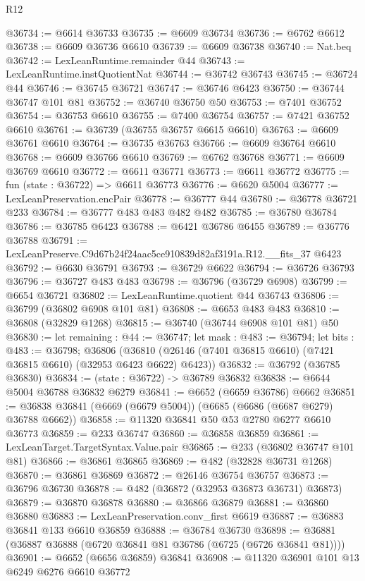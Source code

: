\begin{lexlean}{R12}
\begin{coremodule}
@36734 := @6614 @36733
@36735 := @6609 @36734
@36736 := @6762 @6612
@36738 := @6609 @36736 @6610
@36739 := @6609 @36738
@36740 := Nat.beq
@36742 := LexLeanRuntime.remainder @44
@36743 := LexLeanRuntime.instQuotientNat
@36744 := @36742 @36743
@36745 := @36724 @44
@36746 := @36745 @36721
@36747 := @36746 @6423
@36750 := @36744 @36747 @101 @81
@36752 := @36740 @36750 @50
@36753 := @7401 @36752
@36754 := @36753 @6610
@36755 := @7400 @36754
@36757 := @7421 @36752 @6610
@36761 := @36739 (@36755 @36757 @6615 @6610)
@36763 := @6609 @36761 @6610
@36764 := @36735 @36763
@36766 := @6609 @36764 @6610
@36768 := @6609 @36766 @6610
@36769 := @6762 @36768
@36771 := @6609 @36769 @6610
@36772 := @6611 @36771
@36773 := @6611 @36772
@36775 := fun (state : @36722) => @6611 @36773
@36776 := @6620 @5004
@36777 := LexLeanPreservation.encPair
@36778 := @36777 @44
@36780 := @36778 @36721 @233
@36784 := @36777 @483 @483 @482 @482
@36785 := @36780 @36784
@36786 := @36785 @6423
@36788 := @6421 @36786 @6455
@36789 := @36776 @36788
@36791 := LexLeanPreserve.C9d67b24f24aac5ce910839d82af3191a.R12.__fits_37 @6423
@36792 := @6630 @36791
@36793 := @36729 @6622
@36794 := @36726 @36793
@36796 := @36727 @483 @483
@36798 := @36796 (@36729 @6908)
@36799 := @6654 @36721
@36802 := LexLeanRuntime.quotient @44 @36743
@36806 := @36799 (@36802 @6908 @101 @81)
@36808 := @6653 @483 @483
@36810 := @36808 (@32829 @1268)
@36815 := @36740 (@36744 @6908 @101 @81) @50
@36830 := let remaining : @44 := @36747;
  let mask : @483 := @36794;
  let bits : @483 := @36798;
  @36806 (@36810 (@26146 (@7401 @36815 @6610) (@7421 @36815 @6610) (@32953 @6423 @6622) @6423))
@36832 := @36792 (@36785 @36830)
@36834 := (state : @36722) -> @36789 @36832
@36838 := @6644 @5004 @36788 @36832 @6279
@36841 := @6652 (@6659 @36786) @6662
@36851 := @36838 @36841 (@6669 (@6679 @5004)) (@6685 (@6686 (@6687 @6279) @36788 @6662))
@36858 := @11320 @36841 @50 @53 @2780 @6277 @6610 @36773
@36859 := @233 @36747
@36860 := @36858 @36859
@36861 := LexLeanTarget.TargetSyntax.Value.pair
@36865 := @233 (@36802 @36747 @101 @81)
@36866 := @36861 @36865
@36869 := @482 (@32828 @36731 @1268)
@36870 := @36861 @36869
@36872 := @26146 @36754 @36757
@36873 := @36796 @36730
@36878 := @482 (@36872 (@32953 @36873 @36731) @36873)
@36879 := @36870 @36878
@36880 := @36866 @36879
@36881 := @36860 @36880
@36883 := LexLeanPreservation.conv_first @6619
@36887 := @36883 @36841 @133 @6610 @36859
@36888 := @36784 @36730
@36898 := @36881 (@36887 @36888 (@6720 @36841 @81 @36786 (@6725 (@6726 @36841 @81))))
@36901 := @6652 (@6656 @36859) @36841
@36908 := @11320 @36901 @101 @13 @6249 @6276 @6610 @36772

\end{coremodule}
\end{lexlean}

